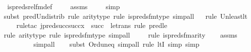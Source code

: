 \begin{isabellebody}
\ is{\isacharunderscore}{\kern0pt}preds{\isacharunderscore}{\kern0pt}rel{\isacharunderscore}{\kern0pt}fm{\isacharunderscore}{\kern0pt}def\ \isanewline
\ \ \isamarkupfalse%
\ assms\ \isanewline
\ \ \isamarkupfalse%
\ simp\isanewline
\ \ \isamarkupfalse%
{\isacharparenleft}{\kern0pt}subst\ pred{\isacharunderscore}{\kern0pt}Un{\isacharunderscore}{\kern0pt}distrib{\isacharcomma}{\kern0pt}\ rule\ arity{\isacharunderscore}{\kern0pt}type{\isacharcomma}{\kern0pt}\ rule\ is{\isacharunderscore}{\kern0pt}preds{\isacharunderscore}{\kern0pt}fm{\isacharunderscore}{\kern0pt}type{\isacharcomma}{\kern0pt}\ simp{\isacharunderscore}{\kern0pt}all{\isacharparenright}{\kern0pt}\isanewline
\ \ \isamarkupfalse%
{\isacharparenleft}{\kern0pt}rule\ Un{\isacharunderscore}{\kern0pt}least{\isacharunderscore}{\kern0pt}lt{\isacharparenright}{\kern0pt}\isanewline
\ \ \ \isamarkupfalse%
{\isacharparenleft}{\kern0pt}rule{\isacharunderscore}{\kern0pt}tac\ j{\isacharequal}{\kern0pt}{\isachardoublequoteopen}pred{\isacharparenleft}{\kern0pt}succ{\isacharparenleft}{\kern0pt}succ{\isacharparenleft}{\kern0pt}x{\isacharparenright}{\kern0pt}{\isacharparenright}{\kern0pt}\ {\isasymunion}\ succ{\isacharparenleft}{\kern0pt}{}{\isacharparenright}{\kern0pt}{\isacharparenright}{\kern0pt}{\isachardoublequoteclose}\ \ le{\isacharunderscore}{\kern0pt}trans{\isacharcomma}{\kern0pt}\ rule\ pred{\isacharunderscore}{\kern0pt}le{\isacharprime}{\kern0pt}{\isacharparenright}{\kern0pt}\isanewline
\ \ \ \ \ \ \isamarkupfalse%
{\isacharparenleft}{\kern0pt}rule\ arity{\isacharunderscore}{\kern0pt}type{\isacharcomma}{\kern0pt}\ rule\ is{\isacharunderscore}{\kern0pt}preds{\isacharunderscore}{\kern0pt}fm{\isacharunderscore}{\kern0pt}type{\isacharcomma}{\kern0pt}\ simp{\isacharunderscore}{\kern0pt}all{\isacharparenright}{\kern0pt}\isanewline
\ \ \ \ \isamarkupfalse%
{\isacharparenleft}{\kern0pt}rule\ is{\isacharunderscore}{\kern0pt}preds{\isacharunderscore}{\kern0pt}fm{\isacharunderscore}{\kern0pt}arity{\isacharparenright}{\kern0pt}\isanewline
\ \ \isamarkupfalse%
\ assms\ \isanewline
\ \ \ \ \ \ \ \isamarkupfalse%
\ simp{\isacharunderscore}{\kern0pt}all\isanewline
\ \ \ \isamarkupfalse%
{\isacharparenleft}{\kern0pt}subst\ Ord{\isacharunderscore}{\kern0pt}un{\isacharunderscore}{\kern0pt}eq{}{\isacharcomma}{\kern0pt}\ simp{\isacharunderscore}{\kern0pt}all{\isacharcomma}{\kern0pt}\ rule\ ltI{\isacharcomma}{\kern0pt}\ simp{\isacharcomma}{\kern0pt}\ simp{\isacharparenright}{\kern0pt}\isanewline

\end{isabellebody}
